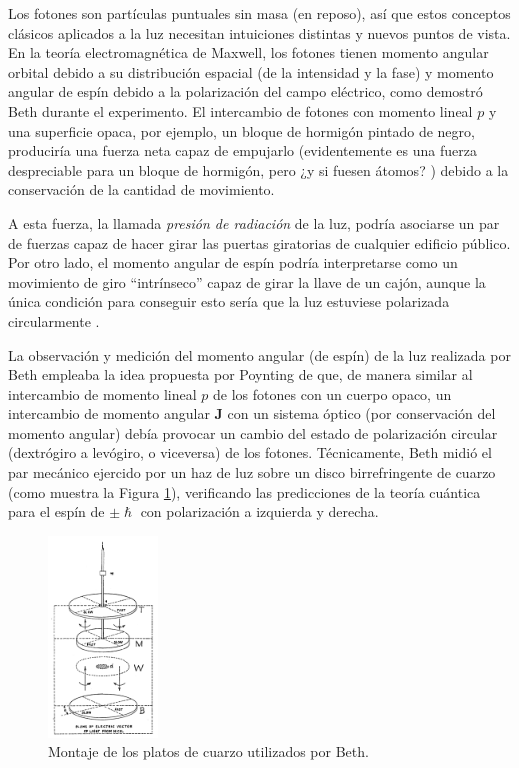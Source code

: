 Los fotones son partículas puntuales sin masa (en reposo), así que estos conceptos clásicos aplicados a la luz necesitan intuiciones distintas y nuevos puntos de vista. En la teoría electromagnética de Maxwell, los fotones tienen momento angular orbital debido a su distribución espacial (de la intensidad y la fase) \autocite{Jackson1998} y momento angular de espín debido a la polarización del campo eléctrico, como demostró Beth \autocite{Beth1936} durante el experimento. El intercambio de fotones con momento lineal $p$ y una superficie opaca, por ejemplo, un bloque de hormigón pintado de negro, produciría una fuerza neta capaz de empujarlo (evidentemente es una fuerza despreciable para un bloque de hormigón, pero ¿y si fuesen átomos? \autocite{Ashkin1970,Ashkin1978}) debido a la conservación de la cantidad de movimiento.

A esta fuerza, la llamada \emph{presión de radiación} de la luz, podría asociarse un par de fuerzas capaz de hacer girar las puertas giratorias de cualquier edificio público. Por otro lado, el momento angular de espín podría interpretarse como un movimiento de giro \enquote{intrínseco} capaz de girar la llave de un cajón, aunque la única condición para conseguir esto sería que la luz estuviese polarizada circularmente \autocite{Beth1936}.

La observación y medición del momento angular (de espín) de la luz realizada por Beth\autocite{Beth1936} empleaba la idea propuesta por Poynting \autocite{Poynting1909} de que, de manera similar al intercambio de momento lineal $p$ de los fotones con un cuerpo opaco, un intercambio de momento angular $\symbf{J}$ con un sistema óptico (por conservación del momento angular) debía provocar un cambio del estado de polarización circular (dextrógiro a levógiro, o viceversa) de los fotones. Técnicamente, Beth midió el par mecánico ejercido por un haz de luz sobre un disco birrefringente de cuarzo (como muestra la Figura \ref{fig:1.14}), verificando las predicciones de la teoría cuántica para el espín de $\pm \hslash $ con polarización a izquierda y derecha.

\begin{figure}[htbp]
  \centering
  \includegraphics[width=0.26\textwidth]{Figuras/ch1_quartz_plate.png}
  \caption{Montaje de los platos de cuarzo utilizados por Beth. \autocite{Beth1936}}
  \label{fig:1.14}
\end{figure}

